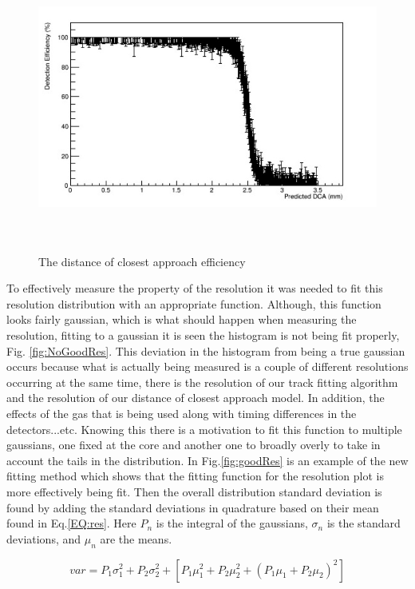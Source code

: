 \documentclass[./Thesis]{subfiles}
\begin{document}
\begin{figure}
	\centerline{\includegraphics[height=95mm]{GoodDCAEff.jpeg}}
	\caption[Good DCA Effieciency]{ The distance of closest approach efficiency}
	\label{fig:goodDCAeff}
\end{figure} 	

	 
	To effectively measure the property of the resolution it was needed to fit this resolution distribution with an appropriate function.  Although, this function looks fairly gaussian, which is what should happen when measuring the resolution, fitting to a gaussian it is seen the histogram is not being fit properly, Fig. \ref{fig:NoGoodRes}. This deviation in the histogram from being a true gaussian occurs because what is actually being measured is a couple of different resolutions occurring at the same time, there is the  resolution of our track fitting algorithm and the resolution of our distance of closest approach model. In addition, the effects of the gas that is being used along with timing differences in the detectors...etc.  Knowing this there is a motivation to fit this function to multiple gaussians, one fixed at the core and another one to broadly overly to take in account the tails in the distribution.  In Fig.\ref{fig:goodRes}  is an example of the new fitting method which shows that the fitting function for the resolution plot is more effectively being fit. Then the overall distribution standard deviation is found by adding the standard deviations in quadrature based on their mean found in Eq.\ref{EQ:res}. Here $P_n$ is the integral of the gaussians, $\sigma_n$ is the standard deviations, and $\mu_n$ are the means.
	
\begin{equation}\label{EQ:res}
var = P_1\sigma_{1}^2 +  P_2\sigma_{2}^2 + [P_{1}\mu_{1}^2+P_{2}\mu_{2}^2 + (P_{1}\mu_{1} + P_{2}\mu_{2})^2]
\end{equation}	
	
\end{document}
